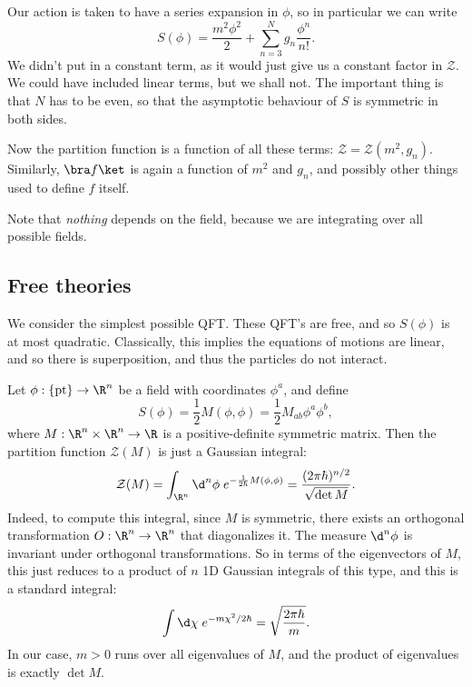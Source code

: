 \documentclass[a4paper]{article}
\begin{document}
Our action is taken to have a series expansion in $\phi$, so in particular we can write
\[
  S(\phi) = \frac{m^2 \phi^2}{2} + \sum_{n = 3}^N g_n \frac{\phi^n}{n!}.
\]
We didn't put in a constant term, as it would just give us a constant factor in $\mathcal{Z}$. We could have included linear terms, but we shall not. The important thing is that $N$ has to be even, so that the asymptotic behaviour of $S$ is symmetric in both sides.

Now the partition function is a function of all these terms: $\mathcal{Z} = \mathcal{Z}(m^2, g_n)$. Similarly, $\bra f\ket$ is again a function of $m^2$ and $g_n$, and possibly other things used to define $f$ itself.

Note that \emph{nothing} depends on the field, because we are integrating over all possible fields.

\subsection{Free theories}
We consider the simplest possible QFT. These QFT's are free, and so $S(\phi)$ is at most quadratic. Classically, this implies the equations of motions are linear, and so there is superposition, and thus the particles do not interact.

Let $\phi: \{\mathrm{pt}\} \to \R^n$ be a field with coordinates $\phi^a$, and define
\[
  S(\phi) = \frac{1}{2} M(\phi, \phi) = \frac{1}{2} M_{ab} \phi^a \phi^b,
\]
where $M: \R^n \times \R^n \to \R$ is a positive-definite symmetric matrix. Then the partition function $\mathcal{Z}(M)$ is just a Gaussian integral:
\[
  \mathcal{Z}(M) = \int_{\R^n} \d^n \phi\; e^{- \frac{1}{2\hbar} M(\phi, \phi)} = \frac{(2 \pi \hbar)^{n/2}}{\sqrt{\det{M}}}.
\]
Indeed, to compute this integral, since $M$ is symmetric, there exists an orthogonal transformation $O: \R^n \to \R^n$ that diagonalizes it. The measure $\d^n \phi$ is invariant under orthogonal transformations. So in terms of the eigenvectors of $M$, this just reduces to a product of $n$ 1D Gaussian integrals of this type, and this is a standard integral:
\[
  \int \d \chi\; e^{-m\chi^2/2\hbar} = \sqrt{\frac{2\pi \hbar}{m}}.
\]
In our case, $m > 0$ runs over all eigenvalues of $M$, and the product of eigenvalues is exactly $\det M$.
\end{document}
